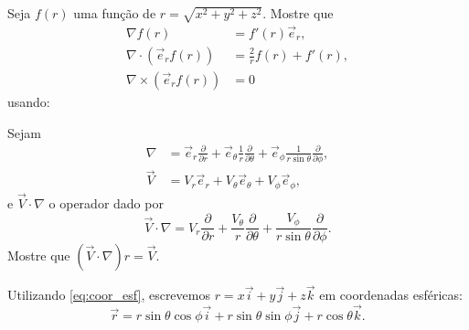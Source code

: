 \documentclass[a4paper,12pt, leqno, answers]{exam}
\newcommand{\devp}[2]{\frac{\partial #1}{\partial #2}}
\begin{document}
\begin{questions}
    \question Seja $f(r)$ uma fun\c{c}\~{a}o de $r = \sqrt{x^2 + y^2 + z^2}$. Mostre que
    \begin{align*}
        \nabla f(r) &= f'(r) \vec{e}_r, \\
        \nabla \cdot (\vec{e}_r f(r)) &= \frac{2}{r} f(r) + f'(r), \\
        \nabla \times (\vec{e}_r f(r)) &= 0
    \end{align*}
    usando:
  
    \question Sejam
    \begin{align*}
        \nabla &= \vec{e}_r \devp{}{r} + \vec{e}_\theta \frac{1}{r} \devp{}{\theta} + \vec{e}_\phi \frac{1}{r \sin \theta} \devp{}{\phi}, \\
        \vec{V} &= V_r \vec{e}_r + V_\theta \vec{e}_\theta + V_\phi \vec{e}_\phi,
    \end{align*}
    e $\vec{V} \cdot \nabla$ o operador dado por
    \[
    \vec{V} \cdot \nabla = V_r \devp{}{r} + \frac{V_\theta}{r} \devp{}{\theta} + \frac{V_\phi}{r \sin \theta} \devp{}{\phi}.
    \]
    Mostre que $(\vec{V} \cdot \nabla) r = \vec{V}$.
    \begin{solution}
        Utilizando \eqref{eq:coor_esf}, escrevemos $r = x \vec{i} + y \vec{j} + z \vec{k}$ em coordenadas esf\'{e}ricas: 
        \[
        \vec{r} = r \sin \theta \cos \phi \vec{i} + r \sin \theta \sin \phi \vec{j} + r \cos \theta \vec{k}.
        \]
        

\end{solution}
\end{questions}
\end{document}
